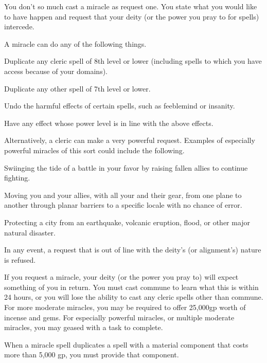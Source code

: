 \begin{spelleffect}
  You don't so much cast a miracle as request one. You state what you would like to have happen and request that your deity (or the power you pray to for spells) intercede.
  \par A miracle can do any of the following things.
  \begin{itemize*}
    \item Duplicate any cleric spell of 8th level or lower (including spells to which you have access because of your domains). 
    \item Duplicate any other spell of 7th level or lower.
    \item Undo the harmful effects of certain spells, such as feeblemind or insanity.
    \item Have any effect whose power level is in line with the above effects.
  \end{itemize*}
  \par Alternatively, a cleric can make a very powerful request. Examples of especially powerful miracles of this sort could include the following.
  \begin{itemize*}
    \item Swiinging the tide of a battle in your favor by raising fallen allies to continue fighting.
    \item Moving you and your allies, with all your and their gear, from one plane to another through planar barriers to a specific locale with no chance of error.
    \item Protecting a city from an earthquake, volcanic eruption, flood, or other major natural disaster.
  \end{itemize*}
  \par In any event, a request that is out of line with the deity's (or alignment's) nature is refused.
\end{spelleffect}
\begin{spellnotes}
  If you request a miracle, your deity (or the power you pray to) will expect something of you in return. You must cast commune to learn what this is within 24 hours, or you will lose the ability to cast any cleric spells other than commune. For more moderate miracles, you may be required to offer 25,000gp worth of incense and gems. For especially powerful miracles, or multiple moderate miracles, you may geased with a task to complete.
  \par When a miracle spell duplicates a spell with a material component that costs more than 5,000 gp, you must provide that component.
\end{spellnotes}

